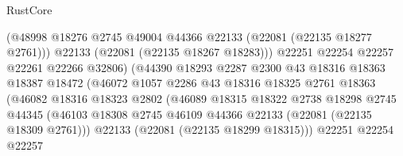 \begin{lexlean}{RustCore}
\begin{coremodule}
                                      (@48998
                                        @18276
                                        @2745
                                        @49004
                                        @44366
                                        @22133
                                        (@22081 (@22135 @18277 @2761)))
                                      @22133
                                      (@22081 (@22135 @18267 @18283)))
                                    @22251
                                    @22254
                                    @22257
                                    @22261
                                    @22266
                                    @32806)
                                  (@44390
                                    @18293
                                    @2287
                                    @2300
                                    @43
                                    @18316
                                    @18363
                                    @18387
                                    @18472
                                    (@46072
                                      @1057
                                      @2286
                                      @43
                                      @18316
                                      @18325
                                      @2761
                                      @18363
                                      (@46082
                                        @18316
                                        @18323
                                        @2802
                                        (@46089
                                          @18315
                                          @18322
                                          @2738
                                          @18298
                                          @2745
                                          @44345
                                          (@46103
                                            @18308
                                            @2745
                                            @46109
                                            @44366
                                            @22133
                                            (@22081 (@22135 @18309 @2761)))
                                          @22133
                                          (@22081 (@22135 @18299 @18315)))
                                        @22251
                                        @22254
                                        @22257

\end{coremodule}
\end{lexlean}
